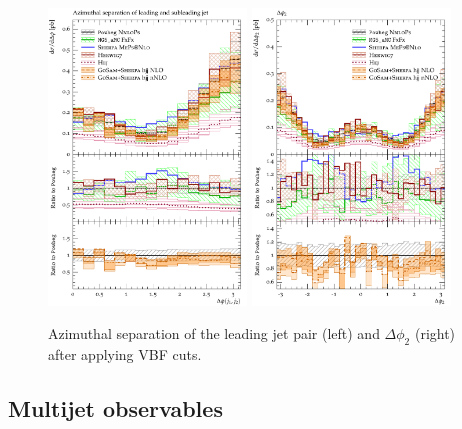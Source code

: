 \begin{figure}[t!]
  \centering
  \includegraphics[width=0.47\textwidth]{figures/hjetscomp_deltaphi_jj_VBF.pdf}
  \quad
  \includegraphics[width=0.47\textwidth]{figures/hjetscomp_deltaphi2_VBF.pdf}
  \caption{
    Azimuthal separation of the leading jet pair (left) and 
    $\Delta\phi_2$ (right) after applying VBF cuts.
    \label{fig:higgscomp:results:VBFobs:dphijj_phi2}
  }
\end{figure}




\subsection{Multijet observables}
\label{sec:hjetscomp:results:mjobs}


